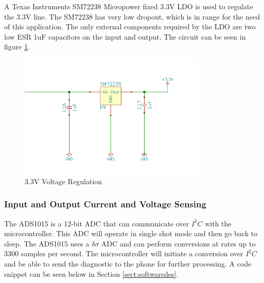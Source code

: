 \documentclass{article}
\numberwithin{figure}{section}
\numberwithin{equation}{section}
\begin{document}
{\bigskip
A Texas Instruments SM72238 Micropower fixed 3.3V LDO is used to regulate the 3.3V line. The SM72238 has very low dropout, which is in range for the need of this application. The only external components required by the LDO are two low ESR 1uF capacitors on the input and output. The circuit can be seen in figure \ref{fig:sm722}.

\begin{figure}[H]
	\centering
	\includegraphics[width=0.8\textwidth]{PS3V}
	\caption{3.3V Voltage Regulation}
	\label{fig:sm722}
\end{figure}


\subsubsection{Input and Output Current and Voltage Sensing}

The ADS1015 is a 12-bit ADC that can communicate over $I^2 C$ with the microcontroller. This ADC will operate in single shot mode and then go back to sleep. The ADS1015 uses a $\delta\sigma$ ADC and can perform conversions at rates up to 3300 samples per second. The microcontroller will initiate a conversion over $I^2 C$ and be able to send the diagnostic to the phone for further processing. A code snippet can be seen below in Section \ref{sect:softwaredes}.

}
\end{document}

